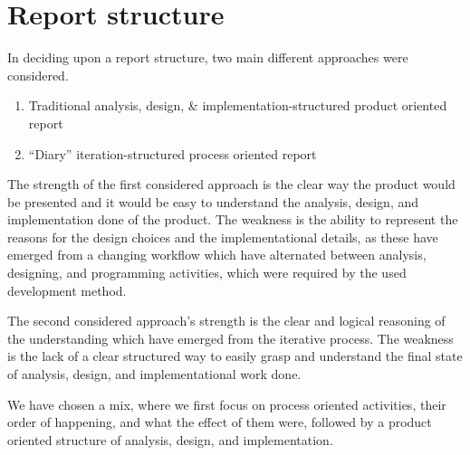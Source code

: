 \chapter{Report structure}
\label{report_structure}

In deciding upon a report structure, two main different approaches were considered.

\begin{enumerate}
	\item Traditional analysis, design, \& implementation-structured product oriented report
	\item ``Diary'' iteration-structured process oriented report
\end{enumerate}

The strength of the first considered approach is the clear way the product would be presented and it would be easy to understand the analysis, design, and implementation done of the product.
The weakness is the ability to represent the reasons for the design choices and the implementational details, as these have emerged from a changing workflow which have alternated between analysis, designing, and programming activities, which were required by the used development method. 

The second considered approach's strength is the clear and logical reasoning of the understanding which have emerged from the iterative process.
The weakness is the lack of a clear structured way to easily grasp and understand the final state of analysis, design, and implementational work done.

We have chosen a mix, where we first focus on process oriented activities, their order of happening, and what the effect of them were, followed by a product oriented structure of analysis, design, and implementation.


